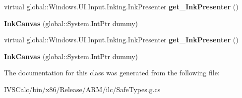 \begin{DoxyCompactItemize}
virtual global\+::\+Windows.\+U\+I.\+Input.\+Inking.\+Ink\+Presenter {\bfseries get\+\_\+\+Ink\+Presenter} ()
\item 
\mbox{\label{class_windows_1_1_u_i_1_1_xaml_1_1_controls_1_1_ink_canvas_a1cadc07ba4ba58f6af6e5c7795bece94}} 
{\bfseries Ink\+Canvas} (global\+::\+System.\+Int\+Ptr dummy)
\item 
\mbox{\label{class_windows_1_1_u_i_1_1_xaml_1_1_controls_1_1_ink_canvas_a6675fa3e25c9c181f970ee5a2f4794c3}} 
virtual global\+::\+Windows.\+U\+I.\+Input.\+Inking.\+Ink\+Presenter {\bfseries get\+\_\+\+Ink\+Presenter} ()
\item 
\mbox{\label{class_windows_1_1_u_i_1_1_xaml_1_1_controls_1_1_ink_canvas_a1cadc07ba4ba58f6af6e5c7795bece94}} 
{\bfseries Ink\+Canvas} (global\+::\+System.\+Int\+Ptr dummy)
\end{DoxyCompactItemize}


The documentation for this class was generated from the following file\+:\begin{DoxyCompactItemize}
\item 
I\+V\+S\+Calc/bin/x86/\+Release/\+A\+R\+M/ilc/Safe\+Types.\+g.\+cs\end{DoxyCompactItemize}
